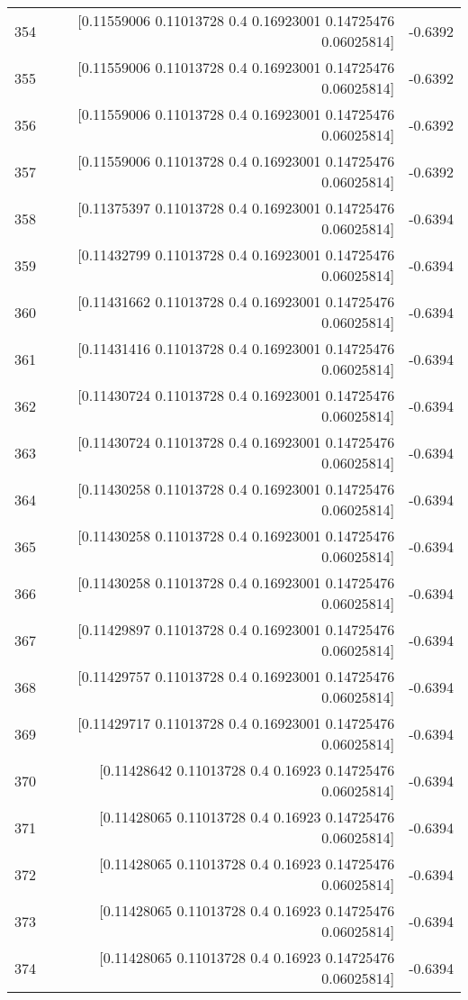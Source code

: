 \begin{longtable}{lrr}
354 & [0.11559006 0.11013728 0.4        0.16923001 0.14725476 0.06025814] & -0.6392 \\
355 & [0.11559006 0.11013728 0.4        0.16923001 0.14725476 0.06025814] & -0.6392 \\
356 & [0.11559006 0.11013728 0.4        0.16923001 0.14725476 0.06025814] & -0.6392 \\
357 & [0.11559006 0.11013728 0.4        0.16923001 0.14725476 0.06025814] & -0.6392 \\
358 & [0.11375397 0.11013728 0.4        0.16923001 0.14725476 0.06025814] & -0.6394 \\
359 & [0.11432799 0.11013728 0.4        0.16923001 0.14725476 0.06025814] & -0.6394 \\
360 & [0.11431662 0.11013728 0.4        0.16923001 0.14725476 0.06025814] & -0.6394 \\
361 & [0.11431416 0.11013728 0.4        0.16923001 0.14725476 0.06025814] & -0.6394 \\
362 & [0.11430724 0.11013728 0.4        0.16923001 0.14725476 0.06025814] & -0.6394 \\
363 & [0.11430724 0.11013728 0.4        0.16923001 0.14725476 0.06025814] & -0.6394 \\
364 & [0.11430258 0.11013728 0.4        0.16923001 0.14725476 0.06025814] & -0.6394 \\
365 & [0.11430258 0.11013728 0.4        0.16923001 0.14725476 0.06025814] & -0.6394 \\
366 & [0.11430258 0.11013728 0.4        0.16923001 0.14725476 0.06025814] & -0.6394 \\
367 & [0.11429897 0.11013728 0.4        0.16923001 0.14725476 0.06025814] & -0.6394 \\
368 & [0.11429757 0.11013728 0.4        0.16923001 0.14725476 0.06025814] & -0.6394 \\
369 & [0.11429717 0.11013728 0.4        0.16923001 0.14725476 0.06025814] & -0.6394 \\
370 & [0.11428642 0.11013728 0.4        0.16923    0.14725476 0.06025814] & -0.6394 \\
371 & [0.11428065 0.11013728 0.4        0.16923    0.14725476 0.06025814] & -0.6394 \\
372 & [0.11428065 0.11013728 0.4        0.16923    0.14725476 0.06025814] & -0.6394 \\
373 & [0.11428065 0.11013728 0.4        0.16923    0.14725476 0.06025814] & -0.6394 \\
374 & [0.11428065 0.11013728 0.4        0.16923    0.14725476 0.06025814] & -0.6394 \\

\end{longtable}
